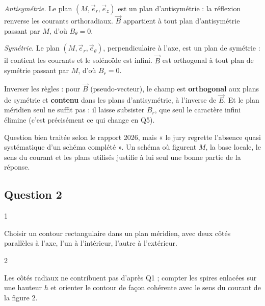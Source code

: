 \documentclass[11pt,a4paper]{article}
\newcommand{\equationajustee}[1]{%
  \sbox{\boiteequation}{$\displaystyle #1$}%
  \ifdim\wd\boiteequation>\linewidth
    \[\resizebox{\linewidth}{!}{\usebox{\boiteequation}}\]%
  \else
    \[#1\]%
  \fi}
\begin{document}
\emph{Antisymétrie.} Le plan \((M,\vec e_r,\vec e_z)\) est un plan d'antisymétrie : la réflexion renverse les courants orthoradiaux. \(\vec B\) appartient à tout plan d'antisymétrie passant par \(M\), d'où \(B_\theta=0\).

\emph{Symétrie.} Le plan \((M,\vec e_r,\vec e_\theta)\), perpendiculaire à l'axe, est un plan de symétrie : il contient les courants et le solénoïde est infini. \(\vec B\) est orthogonal à tout plan de symétrie passant par \(M\), d'où \(B_r=0\).

\equationajustee{\boxed{\vec B(M)=B(r)\,\vec e_z}}

\begin{piege}

Inverser les règles : pour \(\vec B\) (pseudo-vecteur), le champ est \textbf{orthogonal} aux plans de symétrie et \textbf{contenu} dans les plans d'antisymétrie, à l'inverse de \(\vec E\). Et le plan méridien seul ne suffit pas : il laisse subsister \(B_r\), que seul le caractère infini élimine (c'est précisément ce qui change en Q5).

\end{piege}

\begin{jury}

Question bien traitée selon le rapport 2026, mais « le jury regrette l'absence quasi systématique d'un schéma complété ». Un schéma où figurent \(M\), la base locale, le sens du courant et les plans utilisés justifie à lui seul une bonne partie de la réponse.

\end{jury}

\hypertarget{question-2}{%
\subsection{Question 2}\label{question-2}}

\begin{indication}{1}

Choisir un contour rectangulaire dans un plan méridien, avec deux côtés parallèles à l'axe, l'un à l'intérieur, l'autre à l'extérieur.

\end{indication}

\begin{indication}{2}

Les côtés radiaux ne contribuent pas d'après Q1 ; compter les spires enlacées sur une hauteur \(h\) et orienter le contour de façon cohérente avec le sens du courant de la figure 2.

\end{indication}
\end{document}
